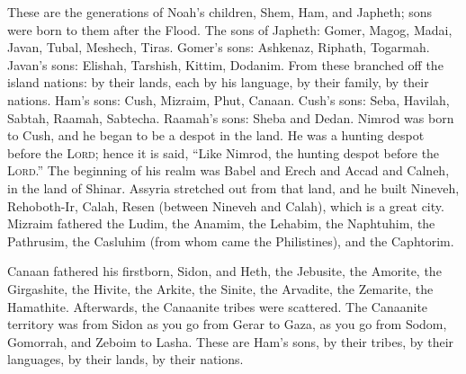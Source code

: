 
\begin{inparaenum}
   These are the generations of Noah's children, Shem, Ham, and Japheth; sons were born to them after the Flood.%
   The sons of Japheth: Gomer, Magog, Madai, Javan, Tubal, Meshech, Tiras.%
   Gomer's sons: Ashkenaz, Riphath, Togarmah.%
   Javan's sons: Elishah, Tarshish, Kittim, Dodanim.%
   From these branched off the island nations: by their lands, each by his language, by their family, by their nations.%
   Ham's sons: Cush, Mizraim, Phut, Canaan.%
   Cush's sons: Seba, Havilah, Sabtah, Raamah, Sabtecha. Raamah's sons: Sheba and Dedan.%
   Nimrod was born to Cush, and he began to be a despot in the land.%
   He was a hunting despot before the \textsc{Lord}; hence it is said, ``Like Nimrod, the hunting despot before the \textsc{Lord}.''%
   The beginning of his realm was Babel and Erech and Accad and Calneh, in the land of Shinar.%
   Assyria stretched out from that land, and he built Nineveh, Rehoboth-Ir, Calah,%
   Resen (between Nineveh and Calah), which is a great city.%
   Mizraim fathered the Ludim, the Anamim, the Lehabim, the Naphtuhim,%
   the Pathrusim, the Casluhim (from whom came the Philistines), and the Caphtorim.%
  
   Canaan fathered his firstborn, Sidon, and Heth,%
   the Jebusite, the Amorite, the Girgashite,%
   the Hivite, the Arkite, the Sinite,%
   the Arvadite, the Zemarite, the Hamathite. Afterwards, the Canaanite tribes were scattered.%
   The Canaanite territory was from Sidon as you go from Gerar to Gaza, as you go from Sodom, Gomorrah, and Zeboim to Lasha.%
   These are Ham's sons, by their tribes, by their languages, by their lands, by their nations.%
  

\end{inparaenum}
